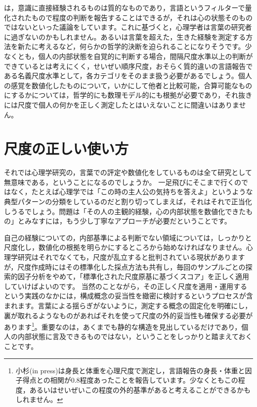 \documentclass{ltjsbook}
\begin{document}
\textcite{Bergson2002}は，意識に直接経験されるものは質的なものであり，言語というフィルターで量化されたもので程度の判断を報告することはできるが，それは心の状態そのものではないといった議論をしています。これに基づくと，心理学者は言葉の研究者に過ぎないのかもしれません。あるいは言葉を超えた，生きた経験を測定する方法を新たに考えるなど，何らかの哲学的決断を迫られることになりそうです。少なくとも，個人の内部状態を自覚的に判断する場合，間隔尺度水準以上の判断ができているとは考えにくく，せいぜい順序尺度，おそらく質的違いの言語報告である名義尺度水準として，各カテゴリをそのまま扱う必要があるでしょう。個人の感覚を数値化したものについて，いかにして他者と比較可能，合算可能なものにするかについては，哲学的にも数理モデル的にも根拠が必要であり，それ抜きには尺度で個人の何かを正しく測定したとはいえないことに間違いはありません。

\section{尺度の正しい使い方}
それでは心理学研究の，言葉での評定や数値化をしているものは全て研究として無意味である，ということになるのでしょうか。
一足飛びにそこまで行くのではなく，たとえば心理学では「この時の主人公の気持ちを答えよ」というような典型パターンの分類をしているのだと割り切ってしまえば，それはそれで正当化しうるでしょう。問題は「その人の主観的経験，心の内部状態を数値化できたもの」とみなすには，もう少し丁寧なアプローチが必要だということです。

自己の経験についての，内部基準による判断でない領域については，しっかりと尺度化し，数値化の根拠を明らかにするところから始めなければなりません。心理学研究はそれでなくても，尺度が乱立すると批判されている現状がありますが，尺度作成時にはその標準化した採点方法も共有し，毎回のサンプルごとの探索的因子分析をやめて，「標準化された尺度原基に基づくスコア」を正しく適用していけばよいのです。
当然のことながら，その正しく尺度を適用・運用するという実践のなかには，構成概念の妥当性を緻密に検討するというプロセスが含まれます。言葉による揺らぎがないように，測定する概念の固定化を明確にし，裏が取れるようなものがあればそれを使って尺度の外的妥当性も確保する必要があります\footnote{小杉(in press)は身長と体重を心理尺度で測定し，言語報告の身長・体重と因子得点との相関が0.8程度あったことを報告しています。少なくともこの程度，あるいはせいぜいこの程度の外的基準があると考えることができるかもしれません。}。重要なのは，あくまでも静的な構造を見出しているだけであり，個人の内部状態に言及できるものではない，ということをしっかりと踏まえておくことです。
\end{document}
